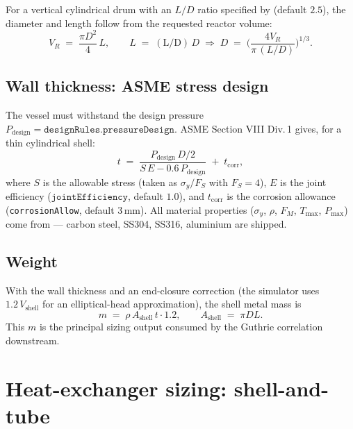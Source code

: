 \documentclass[11pt,a4paper]{article}
\begin{document}
For a vertical cylindrical drum with an $L/D$ ratio specified by
 (default $2.5$), the diameter and
length follow from the requested reactor volume:
\begin{equation}
   V_R \;=\; \frac{\pi D^2}{4}\,L,
   \qquad L \;=\; (\text{L/D})\,D
   \;\Longrightarrow\;
   D \;=\; \biggl(\frac{4 V_R}{\pi\,(L/D)}\biggr)^{1/3}.
\end{equation}

\subsection{Wall thickness: ASME stress design}

The vessel must withstand the design pressure
$P_{\mathrm{design}} = \texttt{designRules.pressureDesign}$. ASME
Section VIII Div.\,1 gives, for a thin cylindrical shell:
\begin{equation}
   t \;=\; \frac{P_{\mathrm{design}}\,D/2}{S\,E - 0.6\,P_{\mathrm{design}}}
        \;+\; t_{\mathrm{corr}},
   \label{eq:asme-thickness}
\end{equation}
where $S$ is the allowable stress (taken as $\sigma_y / F_S$ with
$F_S = 4$), $E$ is the joint efficiency
($\texttt{jointEfficiency}$, default $1.0$), and $t_{\mathrm{corr}}$ is
the corrosion allowance (\texttt{corrosionAllow}, default
$3\,\mathrm{mm}$). All material properties ($\sigma_y$, $\rho$,
$F_M$, $T_{\max}$, $P_{\max}$) come from
 --- carbon steel, SS304,
SS316, aluminium are shipped.

\subsection{Weight}

With the wall thickness and an end-closure correction (the simulator
uses $1.2 \,V_{\mathrm{shell}}$ for an elliptical-head approximation),
the shell metal mass is
\begin{equation}
   m \;=\; \rho \, A_{\mathrm{shell}} \, t \cdot 1.2,
   \qquad
   A_{\mathrm{shell}} \;=\; \pi D L.
\end{equation}
This $m$ is the principal sizing output consumed by the Guthrie
correlation downstream.

\section{Heat-exchanger sizing: shell-and-tube}
\end{document}
